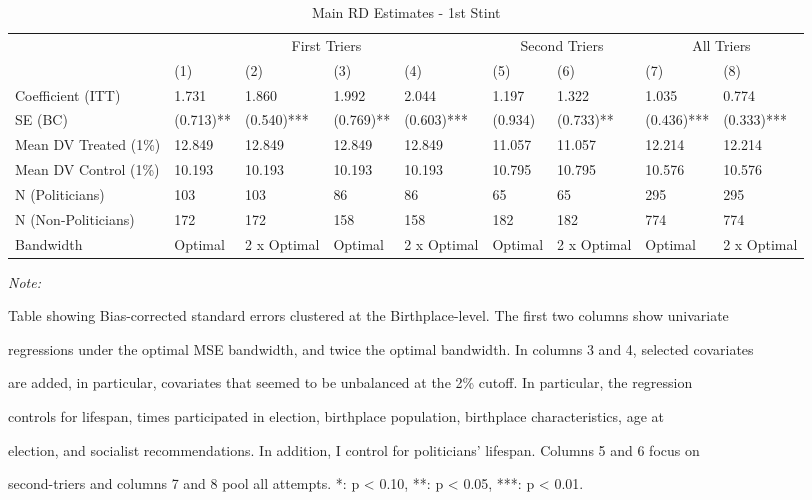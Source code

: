 \begin{table}[!h]

\caption{\label{tab:mainresults}Main RD Estimates - 1st Stint}
\centering
\fontsize{10}{12}\selectfont
\begin{threeparttable}
\begin{tabular}[t]{lllllllll}
\toprule
\multicolumn{1}{c}{ } & \multicolumn{4}{c}{First Triers} & \multicolumn{2}{c}{Second Triers} & \multicolumn{2}{c}{All Triers} \\
\cmidrule(l{3pt}r{3pt}){2-5} \cmidrule(l{3pt}r{3pt}){6-7} \cmidrule(l{3pt}r{3pt}){8-9}
  & (1) & (2) & (3) & (4) & (5) & (6) & (7) & (8)\\
\midrule
Coefficient (ITT) & 1.731 & 1.860 & 1.992 & 2.044 & 1.197 & 1.322 & 1.035 & 0.774\\
SE (BC) & (0.713)** & (0.540)*** & (0.769)** & (0.603)*** & (0.934) & (0.733)** & (0.436)*** & (0.333)***\\
Mean DV Treated (1\%) & 12.849 & 12.849 & 12.849 & 12.849 & 11.057 & 11.057 & 12.214 & 12.214\\
Mean DV Control (1\%) & 10.193 & 10.193 & 10.193 & 10.193 & 10.795 & 10.795 & 10.576 & 10.576\\
N (Politicians) & 103 & 103 & 86 & 86 & 65 & 65 & 295 & 295\\
N (Non-Politicians) & 172 & 172 & 158 & 158 & 182 & 182 & 774 & 774\\
Bandwidth & Optimal & 2 x Optimal & Optimal & 2 x Optimal & Optimal & 2 x Optimal & Optimal & 2 x Optimal\\
\bottomrule
\end{tabular}
\begin{tablenotes}[para]
\item \textit{Note: } 
\item Table showing Bias-corrected standard errors clustered at the Birthplace-level.  The first two columns show univariate
\item regressions under the optimal MSE bandwidth, and twice the optimal bandwidth.  In columns 3 and 4, selected covariates
\item are added, in particular, covariates that seemed to be unbalanced at the 2\% cutoff.  In particular, the regression
\item controls for lifespan, times participated in election, birthplace population, birthplace characteristics, age at
\item election, and socialist recommendations.  In addition, I control for politicians' lifespan. Columns 5 and 6 focus on
\item second-triers and columns 7 and 8 pool all attempts. *: p < 0.10, **: p < 0.05, ***: p < 0.01.
\end{tablenotes}
\end{threeparttable}
\end{table}
